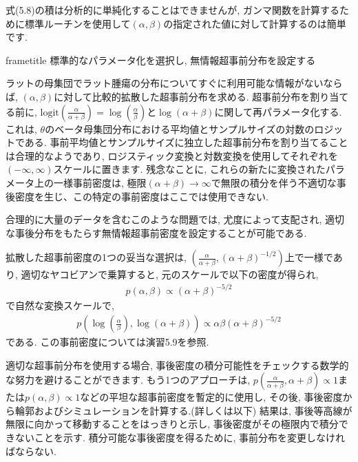 \documentclass[10pt,dvipdfmx,a4]{beamer}
\newcommand{\eq}[1]{\begin{align}#1\end{align}}
\newcommand{\dbox}[1]{\begin{beamercolorbox}[wd=122mm, sep=0pt, shadow=false, rounded=false]{frametitle} { #1}\end{beamercolorbox}}
\begin{document}
\begin{frame}
式(5.8)の積は分析的に単純化することはできませんが, ガンマ関数を計算するために標準ルーチンを使用して$(\alpha,\beta)$の指定された値に対して計算するのは簡単です.

\dbox{標準的なパラメータ化を選択し, 無情報超事前分布を設定する}
ラットの母集団でラット腫瘍の分布についてすぐに利用可能な情報がないならば, $(\alpha,\beta)$に対して比較的拡散した超事前分布を求める.
超事前分布を割り当てる前に, $\text{logit}(\tfrac{\alpha}{\alpha+\beta})=\log(\tfrac{\alpha}{\beta})$と$\log (\alpha+\beta)$に関して再パラメータ化する.
これは, $\theta$のベータ母集団分布における平均値とサンプルサイズの対数のロジットである.
事前平均値とサンプルサイズに独立した超事前分布を割り当てることは合理的なようであり, ロジスティック変換と対数変換を使用してそれぞれを$(-\infty,\infty)$スケールに置きます.
残念なことに, これらの新たに変換されたパラメータ上の一様事前密度は, 極限$(\alpha+\beta)\rightarrow\infty$で無限の積分を伴う不適切な事後密度を生じ、この特定の事前密度はここでは使用できない.

合理的に大量のデータを含むこのような問題では, 尤度によって支配され, 適切な事後分布をもたらす無情報超事前密度を設定することが可能である.
\end{frame}


\begin{frame}
拡散した超事前密度の1つの妥当な選択は, $(\tfrac{\alpha}{\alpha+\beta}, (\alpha+\beta)^{-1/2})$上で一様であり, 適切なヤコビアンで乗算すると, 元のスケールで以下の密度が得られ,
\eq{p(\alpha, \beta)\propto (\alpha+\beta)^{-5/2}}
で自然な変換スケールで,
\eq{p\left(\log \left(\frac{\alpha}{\beta}\right) , \log(\alpha+\beta)\right)\propto \alpha\beta(\alpha+\beta)^{-5/2}}
である.
この事前密度については演習5.9を参照.

適切な超事前分布を使用する場合, 事後密度の積分可能性をチェックする数学的な努力を避けることができます.
もう1つのアプローチは, $p(\tfrac{\alpha}{\alpha+\beta}, \alpha+\beta)\propto 1$または$p(\alpha,\beta)\propto 1$などの平坦な超事前密度を暫定的に使用し, その後, 事後密度から輪郭およびシミュレーションを計算する.(詳しくは以下)
結果は, 事後等高線が無限に向かって移動することをはっきりと示し, 事後密度がその極限内で積分できないことを示す.
積分可能な事後密度を得るために, 事前分布を変更しなければならない.
\end{frame}

\end{document}
